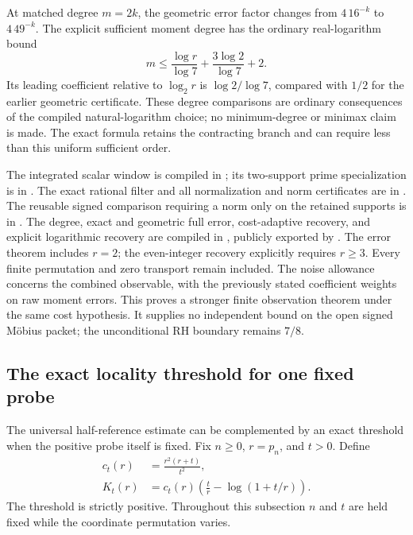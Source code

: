 \documentclass[11pt]{article}
\theoremstyle{definition}
\begin{document}
At matched degree $m=2k$, the geometric error factor changes from
$4\,16^{-k}$ to $4\,49^{-k}$. The explicit sufficient moment degree
has the ordinary real-logarithm bound
\[
 m\le\frac{\log r}{\log7}+\frac{3\log2}{\log7}+2.
\]
Its leading coefficient relative to $\log_2r$ is
$\log2/\log7$, compared with $1/2$ for the earlier geometric
certificate. These degree comparisons are ordinary consequences of
the compiled natural-logarithm choice; no minimum-degree or
minimax claim is made. The exact formula retains the contracting
branch and can require less than this uniform sufficient order.

\begin{flushleft}
The integrated scalar window is compiled in
;
its two-support prime specialization is in
.
The exact rational filter and all normalization and norm certificates are in
.
The reusable signed comparison requiring a norm only on the retained
supports is in .
The degree, exact and geometric full error, cost-adaptive recovery,
and explicit logarithmic recovery are compiled in
, publicly exported by
.
The error theorem includes $r=2$; the even-integer recovery explicitly
requires $r\ge3$. Every finite permutation and zero transport remain
included. The noise allowance concerns the combined observable,
with the previously stated coefficient weights on raw moment errors.
This proves a stronger finite observation theorem under the same cost
hypothesis. It supplies no independent bound on the open signed
M\"obius packet; the unconditional RH boundary remains $7/8$.
\end{flushleft}

\clearpage
\subsection{The exact locality threshold for one fixed probe}

The universal half-reference estimate can be complemented by an exact
threshold when the positive probe itself is fixed. Fix $n\ge0$,
$r=p_n$, and $t>0$. Define
\[
 \begin{split}
 c_t(r)&=\frac{r^2(r+t)}{t^2},\\
 K_t(r)&=c_t(r)\left(\frac tr-\log(1+t/r)\right).
 \end{split}
\]
The threshold is strictly positive. Throughout this subsection $n$
and $t$ are held fixed while the coordinate permutation varies.
\end{document}
